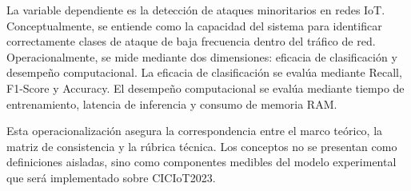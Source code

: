 \documentclass[12pt,a4paper]{article}
\begin{document}
La variable dependiente es la detección de ataques minoritarios en redes IoT. Conceptualmente, se entiende como la capacidad del sistema para identificar correctamente clases de ataque de baja frecuencia dentro del tráfico de red. Operacionalmente, se mide mediante dos dimensiones: eficacia de clasificación y desempeño computacional. La eficacia de clasificación se evalúa mediante Recall, F1-Score y Accuracy. El desempeño computacional se evalúa mediante tiempo de entrenamiento, latencia de inferencia y consumo de memoria RAM.

Esta operacionalización asegura la correspondencia entre el marco teórico, la matriz de consistencia y la rúbrica técnica. Los conceptos no se presentan como definiciones aisladas, sino como componentes medibles del modelo experimental que será implementado sobre CICIoT2023.
\end{document}

